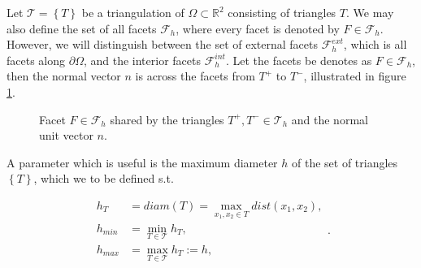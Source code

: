 Let $\mathcal{T}  = \left\{ T \right\} $ be a triangulation of $\Omega \subset   \mathbb{R} ^2 $ consisting of triangles $T$. We may also define the set of all facets $\mathcal{F}_{h}$, where every facet is denoted by $F \in \mathcal{F} _{h}$. However, we will distinguish between the
set of external facets $\mathcal{F}^{ext} _{h}$, which is all facets along $\partial \Omega $, and the interior facets $\mathcal{F} ^{int}_{h}$. Let the facets be denotes as $F \in \mathcal{F } _{h}$, then the normal vector $n$ is across the facets from
$T^{+}$ to $T^{-}$, illustrated in figure \ref{fig:normal}.

\begin{figure}[!h]
\centering
{}
\caption{Facet $F \in \mathcal{F}_h $ shared by the triangles $T^{+}, T^{-} \in \mathcal{T}_{h} $ and the normal unit vector $n$.  }
    \label{fig:normal}
\end{figure}

A parameter which is useful is the maximum diameter $h$ of the set of triangles $\left\{ T \right\} $, which we to be defined s.t.

\begin{equation}
\begin{split}
    h _{T} & = diam\left( T \right)   = \max_{x_1, x_{2} \in T} dist(x_{1}, x_{2}),  \\
    h_{min} & = \min_{T \in \mathcal{T} } h_{T}, \\
    h_{max} &= \max_{T \in \mathcal{T} }  h_{T} := h,
\end{split}
.\end{equation}




